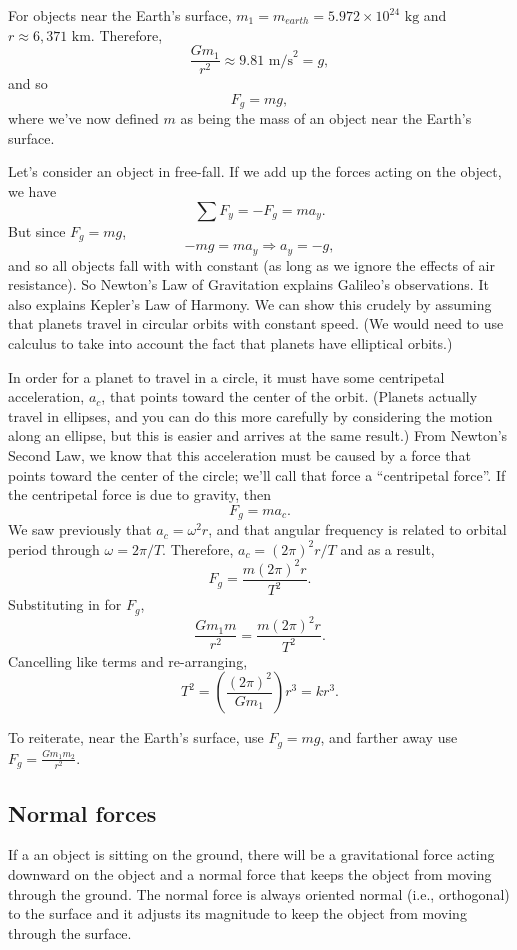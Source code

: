For objects near the Earth's surface, $m_1=m_{earth}=5.972\times 10^{24}\mbox{ kg}$ and $r\approx 6,371\mbox{ km}$. Therefore,
$$\frac{Gm_1}{r^2}\approx 9.81\mbox{ m/s}^2=g,$$
and so
$$F_g=mg,$$
where we've now defined $m$ as being the mass of an object near the Earth's surface.

Let's consider an object in free-fall. If we add up the forces acting on the object, we have
$$\sum F_y=-F_g=ma_y.$$
But since $F_g=mg$,
$$-mg=ma_y\Rightarrow \boxed{a_y=-g},$$
and so all objects fall with with constant (as long as we ignore the effects of air resistance). So Newton's Law of Gravitation explains Galileo's observations. It also explains Kepler's Law of Harmony. We can show this crudely by assuming that planets travel in circular orbits with constant speed. (We would need to use calculus to take into account the fact that planets have elliptical orbits.)

In order for a planet to travel in a circle, it must have some centripetal acceleration, $a_c$, that points toward the center of the orbit. (Planets actually travel in ellipses, and you can do this more carefully by considering the motion along an ellipse, but this is easier and arrives at the same result.) From Newton's Second Law, we know that this acceleration must be caused by a force that points toward the center of the circle; we'll call that force a ``centripetal force''. If the centripetal force is due to gravity, then
$$F_g=ma_c.$$
We saw previously that $a_c=\omega^2 r$, and that angular frequency is related to orbital period through $\omega=2\pi/T$. Therefore, $a_c=(2\pi)^2r/T$ and as a result,
$$F_g=\frac{m(2\pi)^2r}{T^2}.$$
Substituting in for $F_g$,
$$\frac{Gm_1m}{r^2}=\frac{m(2\pi)^2r}{T^2}.$$
Cancelling like terms and re-arranging,
$$\boxed{T^2=\left(\frac{(2\pi)^2}{Gm_1}\right)r^3=kr^3}.$$

To reiterate, near the Earth's surface, use $F_g=mg$, and farther away use $F_g=\frac{Gm_1m_2}{r^2}$.

\subsection{Normal forces}
If a an object is sitting on the ground, there will be a gravitational force acting downward on the object and a normal force that keeps the object from moving through the ground. The normal force is always oriented normal (i.e., orthogonal) to the surface and it adjusts its magnitude to keep the object from moving through the surface.

